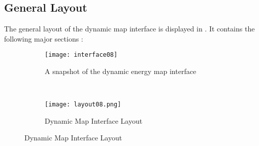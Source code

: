 \subsection{General Layout}
The general layout of the dynamic map interface is displayed in
. It contains the following major sections :
\begin{figure}[h!]
  \centering
  \begin{subfigure}{0.7\textwidth}
  \centering
  \texttt{[image: interface08]}
  \caption[Dynamic Energy Map Interface Snapshot]{A snapshot of the dynamic energy map interface}
  \label{fig:interface08}
\end{subfigure}
~
\begin{subfigure}{0.7\textwidth}
  \centering
  \texttt{[image: layout08.png]}
  \caption[Dynamic Energy Map Interface Layout]{Dynamic Map Interface Layout}
  \label{fig:layout08}
\end{subfigure}
\caption{Dynamic Map Interface Layout}
\label{fig:interfaceLayout}
\end{figure}

